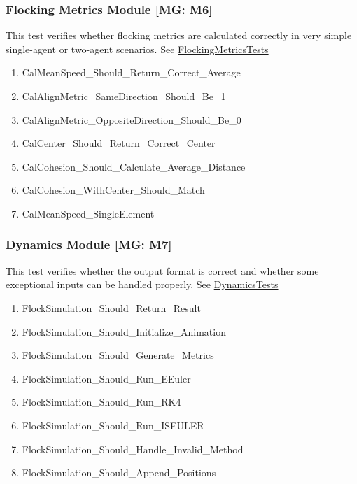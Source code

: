 \documentclass[12pt, titlepage]{article}
\begin{document}
\subsubsection{Flocking Metrics Module [MG: M6]} \label{UTFlockParam}

This test verifies whether flocking metrics are calculated correctly in very 
simple single-agent or two-agent scenarios.
See \href{https://github.com/Mei0725/FlockingSimulator/blob/main/src/Assets/Tests/FlockingCalculator/FlockingMetricsTests.cs}{FlockingMetricsTests}
\begin{enumerate}
  \item CalMeanSpeed\_Should\_Return\_Correct\_Average
  \item CalAlignMetric\_SameDirection\_Should\_Be\_1
  \item CalAlignMetric\_OppositeDirection\_Should\_Be\_0
  \item CalCenter\_Should\_Return\_Correct\_Center
  \item CalCohesion\_Should\_Calculate\_Average\_Distance
  \item CalCohesion\_WithCenter\_Should\_Match
  \item CalMeanSpeed\_SingleElement
\end{enumerate}

\subsubsection{Dynamics Module [MG: M7]} \label{UTDyna}

This test verifies whether the output format is correct and whether some 
exceptional inputs can be handled properly.
See \href{https://github.com/Mei0725/FlockingSimulator/blob/main/src/Assets/Tests/FlockingCalculator/DynamicsTests.cs}{DynamicsTests}
\begin{enumerate}
  \item FlockSimulation\_Should\_Return\_Result
  \item FlockSimulation\_Should\_Initialize\_Animation
  \item FlockSimulation\_Should\_Generate\_Metrics
  \item FlockSimulation\_Should\_Run\_EEuler
  \item FlockSimulation\_Should\_Run\_RK4
  \item FlockSimulation\_Should\_Run\_ISEULER
  \item FlockSimulation\_Should\_Handle\_Invalid\_Method
  \item FlockSimulation\_Should\_Append\_Positions
\end{enumerate}
\end{document}
